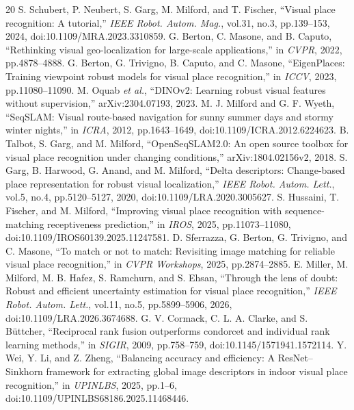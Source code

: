 \documentclass[conference]{IEEEtran}
\begin{document}
\begin{thebibliography}{20}
 S. Schubert, P. Neubert, S. Garg, M. Milford, and T. Fischer, ``Visual place recognition: A tutorial,'' \emph{IEEE Robot. Autom. Mag.}, vol.31, no.3, pp.139--153, 2024, doi:10.1109/MRA.2023.3310859.
 G. Berton, C. Masone, and B. Caputo, ``Rethinking visual geo-localization for large-scale applications,'' in \emph{CVPR}, 2022, pp.4878--4888.
 G. Berton, G. Trivigno, B. Caputo, and C. Masone, ``EigenPlaces: Training viewpoint robust models for visual place recognition,'' in \emph{ICCV}, 2023, pp.11080--11090.
 M. Oquab \emph{et al.}, ``DINOv2: Learning robust visual features without supervision,'' arXiv:2304.07193, 2023.
 M. J. Milford and G. F. Wyeth, ``SeqSLAM: Visual route-based navigation for sunny summer days and stormy winter nights,'' in \emph{ICRA}, 2012, pp.1643--1649, doi:10.1109/ICRA.2012.6224623.
 B. Talbot, S. Garg, and M. Milford, ``OpenSeqSLAM2.0: An open source toolbox for visual place recognition under changing conditions,'' arXiv:1804.02156v2, 2018.
 S. Garg, B. Harwood, G. Anand, and M. Milford, ``Delta descriptors: Change-based place representation for robust visual localization,'' \emph{IEEE Robot. Autom. Lett.}, vol.5, no.4, pp.5120--5127, 2020, doi:10.1109/LRA.2020.3005627.
 S. Hussaini, T. Fischer, and M. Milford, ``Improving visual place recognition with sequence-matching receptiveness prediction,'' in \emph{IROS}, 2025, pp.11073--11080, doi:10.1109/IROS60139.2025.11247581.
 D. Sferrazza, G. Berton, G. Trivigno, and C. Masone, ``To match or not to match: Revisiting image matching for reliable visual place recognition,'' in \emph{CVPR Workshops}, 2025, pp.2874--2885.
 E. Miller, M. Milford, M. B. Hafez, S. Ramchurn, and S. Ehsan, ``Through the lens of doubt: Robust and efficient uncertainty estimation for visual place recognition,'' \emph{IEEE Robot. Autom. Lett.}, vol.11, no.5, pp.5899--5906, 2026, doi:10.1109/LRA.2026.3674688.
 G. V. Cormack, C. L. A. Clarke, and S. B\"uttcher, ``Reciprocal rank fusion outperforms condorcet and individual rank learning methods,'' in \emph{SIGIR}, 2009, pp.758--759, doi:10.1145/1571941.1572114.
 Y. Wei, Y. Li, and Z. Zheng, ``Balancing accuracy and efficiency: A ResNet--Sinkhorn framework for extracting global image descriptors in indoor visual place recognition,'' in \emph{UPINLBS}, 2025, pp.1--6, doi:10.1109/UPINLBS68186.2025.11468446.

\end{thebibliography}
\end{document}
